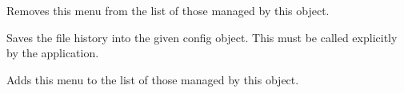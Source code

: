 


Removes this menu from the list of those managed by this object.



Saves the file history into the given config object. This must be called
explicitly by the application.





Adds this menu to the list of those managed by this object.


